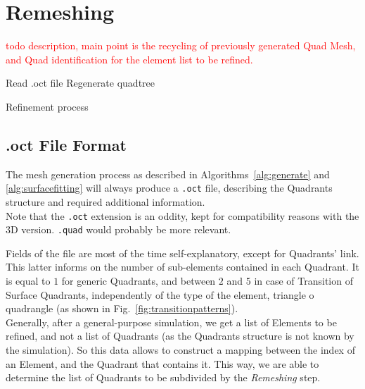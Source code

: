 \documentclass[10pt]{article}
\begin{document}
\section{Remeshing}
\label{sec:remeshing}
\textcolor{red}{todo description, main point is the recycling of previously generated Quad Mesh, and Quad identification for the element list to be refined.}

\begin{algorithm}[H]
\SetAlgoLined
{}
\nl Read .oct file\;
\nl Regenerate quadtree\;
 \caption{Refinement process}
 \label{alg:refinement}
\end{algorithm}

\subsection{.oct File Format}
The mesh generation process as described in Algorithms~\ref{alg:generate} and \ref{alg:surfacefitting} will always produce a \texttt{.oct} file, describing the Quadrants structure and required additional information.\\
Note that the \texttt{.oct} extension is an oddity, kept for compatibility reasons with the 3D version. \texttt{.quad} would probably be more relevant.

Fields of the file are most of the time self-explanatory, except for Quadrants' link. This latter informs on the number of sub-elements contained in each Quadrant. It is equal to $1$ for generic Quadrants, and between $2$ and $5$ in case of Transition of Surface Quadrants, independently of the type of the element, triangle o quadrangle (as shown in Fig.~\ref{fig:transitionpatterns}). \\
Generally, after a general-purpose simulation, we get a list of Elements to be refined, and not a list of Quadrants (as the Quadrants structure is not known by the simulation). So this data allows to construct a mapping between the index of an Element, and the Quadrant that contains it. This way, we are able to determine the list of Quadrants to be subdivided by the \textit{Remeshing} step.
\end{document}
